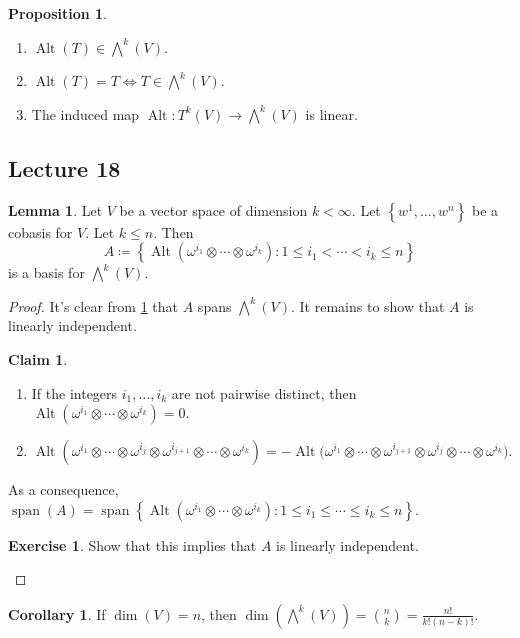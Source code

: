 \documentclass[10pt,letterpaper,cm]{nupset}
\theoremstyle{definition}
\theoremstyle{theorem}
\newtheorem{lemma}[definition]{Lemma}
\newtheorem{prop}[definition]{Proposition}
\newtheorem{corollary}[definition]{Corollary}
\newtheorem*{claim}{Claim}
\newtheorem{exercise}[definition]{Exercise}
\theoremstyle{remark}
\newcommand{\1}{\mathbf{1}}
\newcommand{\0}{\vec 0}
\DeclareMathOperator*{\Span}{span}
\DeclareMathOperator{\Alt}{Alt}
\begin{document}
\begin{prop}\label{alt} $ $
\begin{enumerate}
\item $\Alt(T) \in \bigwedge^k(V)$.
\item $\Alt(T) = T \iff T \in \bigwedge^k(V)$.
\item The induced map $\Alt : T^k(V) \to \bigwedge^k(V)$ is linear. 
\end{enumerate}
\end{prop}

\subsection{Lecture 18}

\begin{lemma}\label{bass}
Let $V$ be a vector space of dimension $k<\infty$. Let $\left\{w^1, \ldots, w^n\right\}$ be a cobasis for $V$. Let $k\leq n$. Then $$A\coloneqq   \left\{\Alt(\omega^{i_1} \otimes \cdots \otimes \omega^{i_k}) : 1 \leq i_1 < \cdots < i_k \leq n \right\} $$ is a basis for $\bigwedge^k(V)$.
\end{lemma}
\begin{proof}
It's clear from \cref{alt} that $A$ spans $\bigwedge^k(V)$. It remains to show that $A$ is linearly independent. 
\begin{claim} $ $
\begin{enumerate}[label=(\alph*)]
\item If the integers $i_1, \ldots, i_k$ are not pairwise distinct, then $\Alt(\omega^{i_1} \otimes \cdots \otimes \omega^{i_k}) = 0$.
\item $\Alt(\omega^{i_1} \otimes \cdots \otimes \omega^{i_j} \otimes \omega^{i_{j+1}} \otimes \cdots \otimes \omega^{i_k}) = {-\Alt(\omega^{i_1}} \otimes \cdots \otimes \omega^{i_{j+1}} \otimes \omega^{i_{j}} \otimes \cdots \otimes \omega^{i_k}).$
\end{enumerate}
\end{claim}%

As a consequence, $\Span(A) = \Span{\left\{\Alt(\omega^{i_1} \otimes \cdots \otimes \omega^{i_k}) : 1 \leq i_1 \leq \cdots \leq i_k \leq n\right \}}$.

\begin{exercise}
Show that this implies that $A$ is linearly independent.
\end{exercise}
\end{proof}

\begin{corollary}
If $\dim(V) = n$, then $\dim\left(\bigwedge^k(V)\right) = {n\choose k} = \frac{n!}{k!(n-k)!}$.
\end{corollary}
\end{document}
